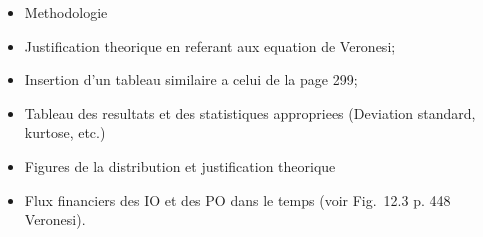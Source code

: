 

\begin{itemize}
\item Methodologie
\item Justification theorique en referant aux equation de Veronesi;
\item Insertion d'un tableau similaire a celui de la page 299;
\item Tableau des resultats et des statistiques appropriees (Deviation standard, kurtose,
  etc.)
\item Figures de la distribution et justification theorique
\item Flux financiers des IO et des PO dans le temps (voir Fig.~12.3 p. 448
  Veronesi).\cite{diebold,brigo}
\end{itemize}

\small

\normalsize

